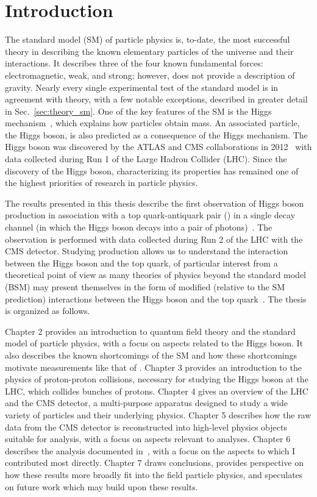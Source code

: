 \chapter{Introduction} \label{chap:introduction}

The standard model (SM) of particle physics is, to-date, the most successful theory in describing the known elementary particles of the universe and their interactions.
It describes three of the four known fundamental forces: electromagnetic, weak, and strong; however, does not provide a description of gravity.
Nearly every single experimental test of the standard model is in agreement with theory, with a few notable exceptions, described in greater detail in Sec.~\ref{sec:theory_sm}.
One of the key features of the SM is the Higgs mechanism~\cite{Higgs:1964pj,Englert:1964et,Guralnik:1964eu}, which explains how particles obtain mass.
An associated particle, the Higgs boson, is also predicted as a consequence of the Higgs mechanism.
The Higgs boson was discovered by the ATLAS and CMS collaborations in 2012~\cite{Aad:2012tfa, Chatrchyan:2012xdj, Chatrchyan:2013lba} with data collected during Run 1 of the Large Hadron Collider (LHC).
Since the discovery of the Higgs boson, characterizing its properties has remained one of the highest priorities of research in particle physics.

The results presented in this thesis describe the first observation of Higgs boson production in association with a top quark-antiquark pair (\ttH) in a single decay channel (in which the Higgs boson decays into a pair of photons)~\cite{tth_observation}.
The observation is performed with data collected during Run 2 of the LHC with the CMS detector.
Studying \ttH production allows us to understand the interaction between the Higgs boson and the top quark, of particular interest from a theoretical point of view as many theories of physics beyond the standard model (BSM) may present themselves in the form of modified (relative to the SM prediction) interactions between the Higgs boson and the top quark~\cite{why_care_top_yukawa}.
The thesis is organized as follows.

Chapter 2 provides an introduction to quantum field theory and the standard model of particle physics, with a focus on aspects related to the Higgs boson. It also describes the known shortcomings of the SM and how these shortcomings motivate measurements like that of \ttH. 
Chapter 3 provides an introduction to the physics of proton-proton collisions, necessary for studying the Higgs boson at the LHC, which collides bunches of protons.
Chapter 4 gives an overview of the LHC and the CMS detector, a multi-purpose apparatus designed to study a wide variety of particles and their underlying physics.
Chapter 5 describes how the raw data from the CMS detector is reconstructed into high-level physics objects suitable for analysis, with a focus on aspects relevant to \Hgg analyses.
Chapter 6 describes the \ttH analysis documented in~\cite{tth_observation}, with a focus on the aspects to which I contributed most directly.
Chapter 7 draws conclusions, provides perspective on how these results more broadly fit into the field particle physics, and speculates on future work which may build upon these results. 

